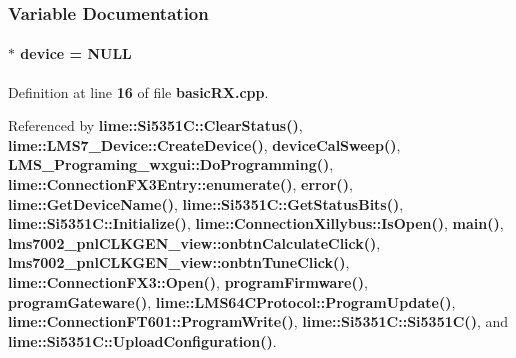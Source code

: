\subsubsection{Variable Documentation}
\paragraph[{device}]{$\ast$ device = N\+U\+LL}\label{basicRX_8cpp_a6bc15a746822d9c4a5621463acd4ca25}


Definition at line {\bf 16} of file {\bf basic\+R\+X.\+cpp}.



Referenced by {\bf lime\+::\+Si5351\+C\+::\+Clear\+Status()}, {\bf lime\+::\+L\+M\+S7\+\_\+\+Device\+::\+Create\+Device()}, {\bf device\+Cal\+Sweep()}, {\bf L\+M\+S\+\_\+\+Programing\+\_\+wxgui\+::\+Do\+Programming()}, {\bf lime\+::\+Connection\+F\+X3\+Entry\+::enumerate()}, {\bf error()}, {\bf lime\+::\+Get\+Device\+Name()}, {\bf lime\+::\+Si5351\+C\+::\+Get\+Status\+Bits()}, {\bf lime\+::\+Si5351\+C\+::\+Initialize()}, {\bf lime\+::\+Connection\+Xillybus\+::\+Is\+Open()}, {\bf main()}, {\bf lms7002\+\_\+pnl\+C\+L\+K\+G\+E\+N\+\_\+view\+::onbtn\+Calculate\+Click()}, {\bf lms7002\+\_\+pnl\+C\+L\+K\+G\+E\+N\+\_\+view\+::onbtn\+Tune\+Click()}, {\bf lime\+::\+Connection\+F\+X3\+::\+Open()}, {\bf program\+Firmware()}, {\bf program\+Gateware()}, {\bf lime\+::\+L\+M\+S64\+C\+Protocol\+::\+Program\+Update()}, {\bf lime\+::\+Connection\+F\+T601\+::\+Program\+Write()}, {\bf lime\+::\+Si5351\+C\+::\+Si5351\+C()}, and {\bf lime\+::\+Si5351\+C\+::\+Upload\+Configuration()}.

